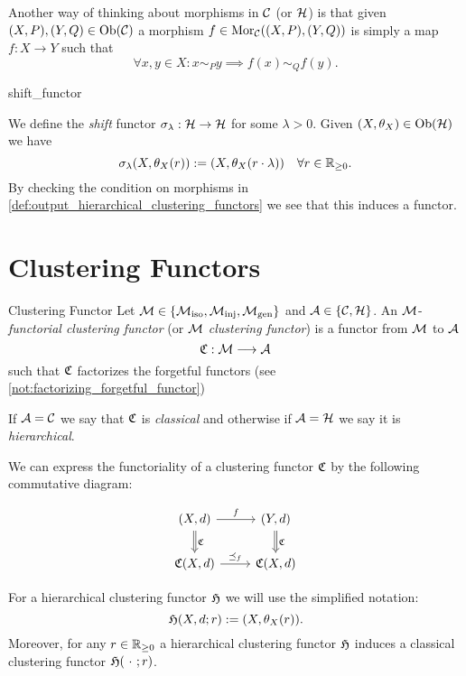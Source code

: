 Another way of thinking about morphisms in $\mathcal{C}$ (or $\mathcal{H}$) is that given $(X,P), (Y,Q) \in \mathrm {Ob}(\mathcal{C})$ a morphism $f \in \mathrm {Mor}_{\mathcal{C}}((X,P), (Y,Q))$ is simply a map $f: X \to Y$ such that
$$
\forall x,y \in X: x \sim_P y \implies f(x) \sim_Q f(y).
$$

\begin{definition}{}{shift_functor}

We define the \emph{shift} functor $\sigma_\lambda: \mathcal{H} \to \mathcal{H}$ for some $\lambda > 0$. Given $(X, \theta_X) \in \mathrm {Ob}(\mathcal{H})$ we have
$$
\sigma_\lambda(X, \theta_X(r)) := (X, \theta_X(r \cdot \lambda)) \quad \forall r \in \mathbb R_{\geq0}.
$$
By checking the condition on morphisms in \ref{def:output_hierarchical_clustering_functors} we see that this induces a functor.
\end{definition}

\section{Clustering Functors}
\begin{definition}{Clustering Functor \cite[Sec.~4.1]{Carlsson2010}}{}
Let $\mathcal{M} \in \{{\mathcal{M}_\mathrm{iso}}, {\mathcal{M}_\mathrm{inj}}, {\mathcal{M}_\mathrm{gen}}\}$ and $\mathcal{A} \in \{\mathcal{C}, \mathcal{H}\}$. An $\mathcal{M}$-\emph{functorial clustering functor} (or $\mathcal{M}$ \emph{clustering functor}) is a functor from $\mathcal{M}$ to $\mathcal{A}$
$$\mathfrak{C} : \mathcal{M} \longrightarrow \mathcal{A}$$
such that $\mathfrak{C}$ factorizes the forgetful functors (see \ref{not:factorizing_forgetful_functor}) \par

\medskip If $\mathcal{A} = \mathcal{C}$ we say that $\mathfrak{C}$ is \emph{classical} and otherwise if $\mathcal{A} = \mathcal{H}$ we say it is \emph{hierarchical}.
\end{definition}

We can express the functoriality of a clustering functor $\mathfrak{C}$ by the following commutative diagram:

\begin{equation*}
    \begin{tikzcd}
    {(X,d)} \arrow[r, "f"] \arrow[d, "\Cf", Rightarrow] & {(Y,d)} \arrow[d, "\Cf", Rightarrow] \\
    {\Cf(X,d)} \arrow[r, "\refines_f"]                  & {\Cf(X,d)}                          
    \end{tikzcd}
\end{equation*}

For a hierarchical clustering functor $\mathfrak{H}$ we will use the simplified notation:
$$
\mathfrak{H}(X,d;r) := (X,\theta_X(r)).
$$
Moreover, for any $r \in \mathbb R_{\geq0}$ a hierarchical clustering functor $\mathfrak{H}$ induces a classical clustering functor $\Hf(\ \cdot \ ;r)$.

